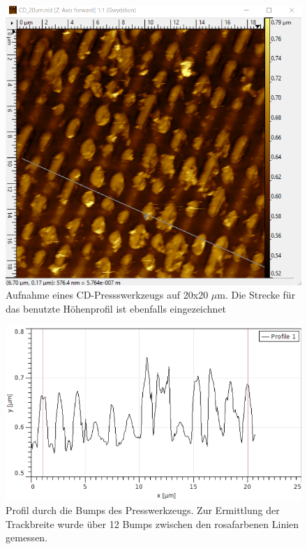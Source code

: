 \begin{figure}[h]
    \centering
    \includegraphics[scale = 0.5]{Bilder/CD20Linie.png}
    \caption{Aufnahme eines CD-Pressswerkzeugs auf 20x20 $\mu$m. Die Strecke 
    für das benutzte Höhenprofil ist ebenfalls eingezeichnet}
    \label{bild:CD20Linie}
\end{figure}

\begin{figure}[h]
    \centering
    \includegraphics[scale = 0.6]{Bilder/CD20Profil.png}
    \caption{Profil durch die Bumps des Presswerkzeugs. Zur Ermittlung der Trackbreite wurde über 12 Bumps zwischen den rosafarbenen 
    Linien gemessen.}
    \label{bild:CD20Profil}
\end{figure}


